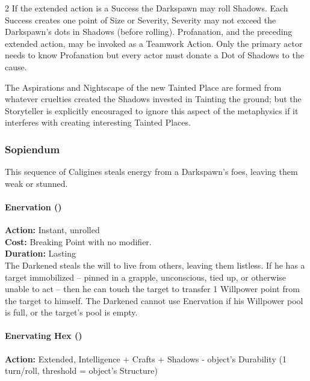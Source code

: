 \begin{multicols}{2}
If the extended action is a Success the Darkspawn may roll Shadows. Each Success creates one point of Size or Severity, Severity may not exceed the Darkspawn's dots in Shadows (before rolling). Profanation, and the preceding extended action, may be invoked as a Teamwork Action. Only the primary actor needs to know Profanation but every actor must donate a Dot of Shadows to the cause.

The Aspirations and Nightscape of the new Tainted Place are formed from whatever cruelties created the Shadows invested in Tainting the ground; but the Storyteller is explicitly encouraged to ignore this aspect of the metaphysics if it interferes with creating interesting Tainted Places.

\subsubsection*{Sopiendum}

This sequence of Caligines steals energy from a Darkspawn's foes, leaving them weak or stunned. \\

\paragraph*{Enervation (\textbullet)}

\noindent \textbf{Action:} Instant, unrolled \\

\noindent \textbf{Cost:} Breaking Point with no modifier. \\

\noindent \textbf{Duration:} Lasting \\

\noindent The Darkened steals the will to live from others, leaving them listless. If he has a target immobilized -- pinned in a grapple, unconscious, tied up, or otherwise unable to act -- then he can touch the target to transfer 1 Willpower point from the target to himself. The Darkened cannot use Enervation if his Willpower pool is full, or the target's pool is empty. \\

\paragraph*{Enervating Hex (\textbullet\textbullet)}

\noindent \textbf{Action:} Extended, Intelligence + Crafts + Shadows - object's Durability (1 turn/roll, threshold = object's Structure) \\


\end{multicols}
